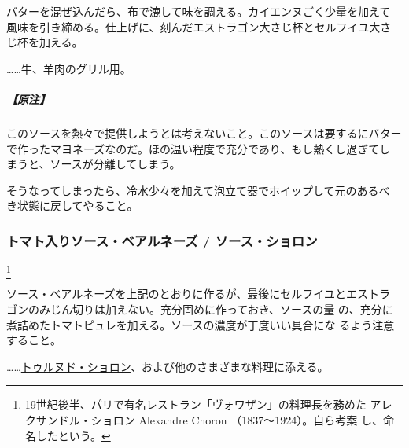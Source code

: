 \begin{recette}
バターを混ぜ込んだら、布で漉して味を調える。カイエンヌごく少量を加えて
風味を引き締める。仕上げに、刻んだエストラゴン大さじ杯とセルフイユ大さ
じ\undemi{}杯を加える。

\ldots{}\ldots{}牛、羊肉のグリル用。

\hypertarget{ux539fux6ce8}{%
\subparagraph{【原注】}\label{ux539fux6ce8}}

このソースを熱々で提供しようとは考えないこと。このソースは要するにバター
で作ったマヨネーズなのだ。ほの温い程度で充分であり、もし熱くし過ぎてし
まうと、ソースが分離してしまう。

そうなってしまったら、冷水少々を加えて泡立て器でホイップして元のあるべ
き状態に戻してやること。

\maeaki

\hypertarget{sauce-bearnaise-tomatee}{%
\subsubsection{トマト入りソース・ベアルネーズ /
ソース・ショロン}\label{sauce-bearnaise-tomatee}}

\footnote{19世紀後半、パリで有名レストラン「ヴォワザン」の料理長を務めた
  アレクサンドル・ショロン Alexandre Choron （1837〜1924）。自ら考案
  し、命名したという。}


ソース・ベアルネーズを上記のとおりに作るが、最後にセルフイユとエストラ
ゴンのみじん切りは加えない。充分固めに作っておき、ソースの\unquart{}量
の、充分に煮詰めたトマトピュレを加える。ソースの濃度が丁度いい具合にな
るよう注意すること。

\ldots{}\ldots{}\protect\hyperlink{tournedos-choron}{トゥルヌド・ショロン}、および他のさまざまな料理に添える。

\maeaki

\hypertarget{sauce-bearnaise-a-la-glace-de-viande}{%
}
\end{recette}

